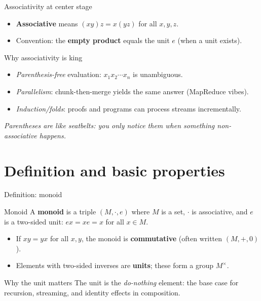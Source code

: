 \documentclass[aspectratio=169,11pt]{beamer}
\newcommand{\tline}[1]{\par\medskip\textcolor{transit}{\emph{#1}}\par\medskip}
\begin{document}
\begin{frame}{Associativity at center stage}
\begin{itemize}
  \item \textbf{Associative} means $(xy)z=x(yz)$ for all $x,y,z$.
  \item Convention: the \textbf{empty product} equals the unit $e$ (when a unit exists).
\end{itemize}
\begin{block}{Why associativity is king}
\begin{itemize}
  \item \emph{Parenthesis-free} evaluation: $x_1x_2\cdots x_n$ is unambiguous.
  \item \emph{Parallelism}: chunk-then-merge yields the same answer (MapReduce vibes).
  \item \emph{Induction/folds}: proofs and programs can process streams incrementally.
\end{itemize}
\end{block}
\tline{Parentheses are like seatbelts: you only notice them when something non-associative happens.}
\end{frame}

\section{Definition and basic properties}
\begin{frame}{Definition: monoid}
\begin{block}{Monoid}
A \textbf{monoid} is a triple $(M,\cdot,e)$ where $M$ is a set, $\cdot$ is associative, and $e$ is a two-sided unit: $ex=xe=x$ for all $x\in M$.
\end{block}
\begin{itemize}
  \item If $xy=yx$ for all $x,y$, the monoid is \textbf{commutative} (often written $(M,+,0)$).
  \item Elements with two-sided inverses are \textbf{units}; these form a group $M^\times$.
\end{itemize}
\begin{alertblock}{Why the unit matters}
The unit is the \emph{do-nothing} element: the base case for recursion, streaming, and identity effects in composition.
\end{alertblock}
\end{frame}
\end{document}
